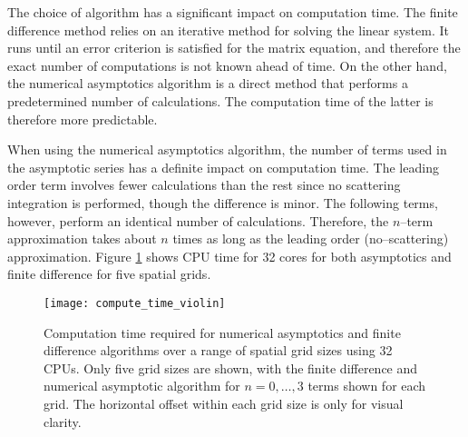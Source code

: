 The choice of algorithm has a significant impact on computation time.
The finite difference method relies on an iterative method for solving the linear system.
It runs until an error criterion is satisfied for the matrix equation, and therefore the exact number of computations is not known ahead of time.
On the other hand, the numerical asymptotics algorithm is a direct method that performs a predetermined number of calculations.
The computation time of the latter is therefore more predictable.

When using the numerical asymptotics algorithm, the number of terms used in the asymptotic series has a definite impact on computation time.
The leading order term involves fewer calculations than the rest since no scattering integration is performed, though the difference is minor.
The following terms, however, perform an identical number of calculations.
Therefore, the $n$--term approximation takes about $n$ times as long as the leading order (no--scattering) approximation.
Figure \ref{fig:compute_time_violin} shows CPU time for 32 cores for both asymptotics and finite difference for five spatial grids.

\begin{figure}[h]
  \centering
  \texttt{[image: compute\_time\_violin]}
  \caption{Computation time required for numerical asymptotics and finite difference algorithms over a range of spatial grid sizes using 32 CPUs. Only five grid sizes are shown, with the finite difference and numerical asymptotic algorithm for $n=0,\ldots,3$ terms shown for each grid. The horizontal offset within each grid size is only for visual clarity.}
  \label{fig:compute_time_violin}
\end{figure}


